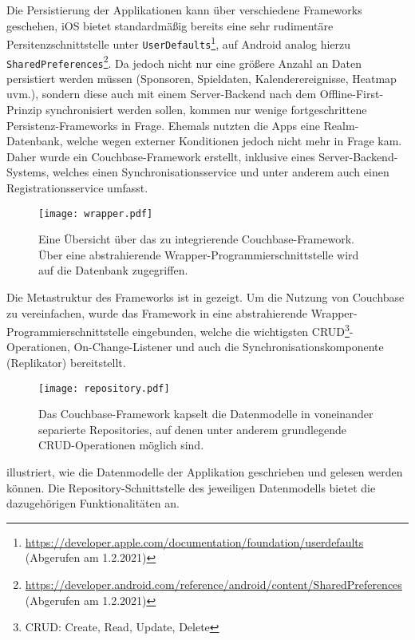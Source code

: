 Die Persistierung der Applikationen kann über verschiedene Frameworks geschehen, iOS bietet standardmäßig bereits eine sehr rudimentäre Persitenzschnittstelle unter \texttt{UserDefaults}\footnote{\url{https://developer.apple.com/documentation/foundation/userdefaults} (Abgerufen am 1.2.2021)}, auf Android analog hierzu \texttt{SharedPreferences}\footnote{\url{https://developer.android.com/reference/android/content/SharedPreferences} (Abgerufen am 1.2.2021)}. Da jedoch nicht nur eine größere Anzahl an Daten persistiert werden müssen (Sponsoren, Spieldaten, Kalenderereignisse, Heatmap uvm.), sondern diese auch mit einem Server-Backend nach dem Offline-First-Prinzip synchronisiert werden sollen, kommen nur wenige fortgeschrittene Persistenz-Frameworks in Frage. Ehemals nutzten die Apps eine Realm-Datenbank, welche wegen externer Konditionen jedoch nicht mehr in Frage kam. Daher wurde ein Couchbase-Framework erstellt, inklusive eines Server-Backend-Systems, welches einen Synchronisationsservice und unter anderem auch einen Registrationsservice umfasst.

\begin{figure}[H]
\texttt{[image: wrapper.pdf]}
\caption{Eine Übersicht über das zu integrierende Couchbase-Framework. Über eine abstrahierende Wrapper-Programmierschnittstelle wird auf die Datenbank zugegriffen.}\label{fig:wrapper}
\end{figure}

\noindent Die Metastruktur des Frameworks ist in  gezeigt. Um die Nutzung von Couchbase zu vereinfachen, wurde das Framework in eine abstrahierende Wrapper-Programmierschnittstelle eingebunden, welche die wichtigsten CRUD\footnote{CRUD: Create, Read, Update, Delete}-Operationen, On-Change-Listener und auch die Synchronisationskomponente (Replikator) bereitstellt.

\begin{figure}[H]
\texttt{[image: repository.pdf]}
\caption{Das Couchbase-Framework kapselt die Datenmodelle in voneinander separierte Repositories, auf denen unter anderem grundlegende CRUD-Operationen möglich sind.}\label{fig:repository}
\end{figure}

\noindent {} illustriert, wie die Datenmodelle der Applikation geschrieben und gelesen werden können. Die Repository-Schnittstelle des jeweiligen Datenmodells bietet die dazugehörigen Funktionalitäten an.

